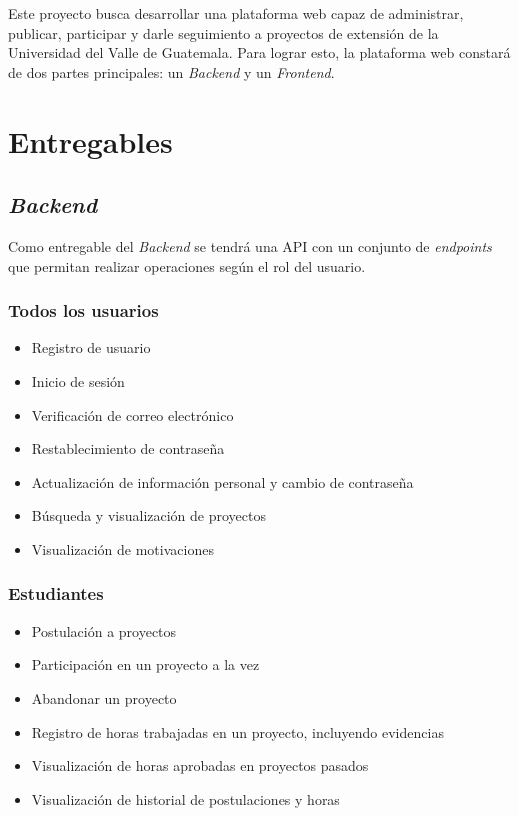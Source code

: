 Este proyecto busca desarrollar una plataforma web capaz de administrar, publicar, participar
y darle seguimiento a proyectos de extensión de la Universidad del Valle de Guatemala.
Para lograr esto, la plataforma web constará de dos partes principales: un \textit{Backend} 
y un \textit{Frontend}.

\section{Entregables}
\subsection{\textit{Backend}}
Como entregable del \textit{Backend} se tendrá una API con un conjunto de \textit{endpoints}
que permitan realizar operaciones según el rol del usuario.

\subsubsection{Todos los usuarios}
\begin{itemize}
    \item Registro de usuario
    \item Inicio de sesión
    \item Verificación de correo electrónico
    \item Restablecimiento de contraseña
    \item Actualización de información personal y cambio de contraseña
    \item Búsqueda y visualización de proyectos
    \item Visualización de motivaciones
\end{itemize}

\subsubsection{Estudiantes}
\begin{itemize}
    \item Postulación a proyectos
    \item Participación en un proyecto a la vez
    \item Abandonar un proyecto
    \item Registro de horas trabajadas en un proyecto, incluyendo evidencias
    \item Visualización de horas aprobadas en proyectos pasados
    \item Visualización de historial de postulaciones y horas
\end{itemize}

